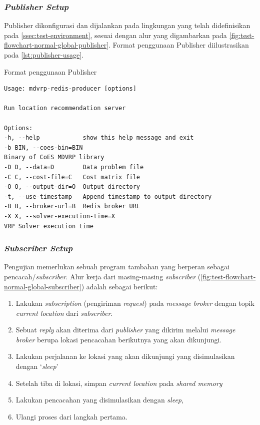 \subsubsection{\textit{Publisher Setup}}
Publisher dikonfigurasi dan dijalankan pada lingkungan yang telah didefinisikan pada \autoref{ssec:test-environment}, sesuai dengan alur yang digambarkan pada \autoref{fig:test-flowchart-normal-global-publisher}. Format penggunaan Publisher diilustrasikan pada \autoref{lst:publisher-usage}.


\begin{listing}[!]
	\caption{Format penggunaan Publisher}
	\label{lst:publisher-usage}
	\begin{verbatim}
Usage: mdvrp-redis-producer [options]

Run location recommendation server

Options:
-h, --help            show this help message and exit
-b BIN, --coes-bin=BIN
Binary of CoES MDVRP library
-D D, --data=D        Data problem file
-C C, --cost-file=C   Cost matrix file
-O O, --output-dir=O  Output directory
-t, --use-timestamp   Append timestamp to output directory
-B B, --broker-url=B  Redis broker URL
-X X, --solver-execution-time=X
VRP Solver execution time
	\end{verbatim}
\end{listing}


\subsubsection{\textit{Subscriber Setup}}
Pengujian memerlukan sebuah program tambahan yang berperan sebagai pencacah/\textit{subscriber}. Alur kerja dari masing-masing \textit{subscriber} (\autoref{fig:test-flowchart-normal-global-subscriber}) adalah sebagai berikut:


\begin{enumerate}
	\item Lakukan \textit{subscription} (pengiriman \textit{request}) pada \textit{message broker} dengan topik \textit{current location} dari \textit{subscriber}. 
	\item Sebuat \textit{reply} akan diterima dari \textit{publisher} yang dikirim melalui \textit{message broker} berupa lokasi pencacahan berikutnya yang akan dikunjungi. 
	\item Lakukan perjalanan ke lokasi yang akan dikunjungi yang disimulasikan dengan `\textit{sleep}'
	\item Setelah tiba di lokasi, simpan \textit{current location} pada \textit{shared memory} 
	\item Lakukan pencacahan yang disimulasikan dengan \textit{sleep}, 
	\item Ulangi proses dari langkah pertama.
\end{enumerate}


